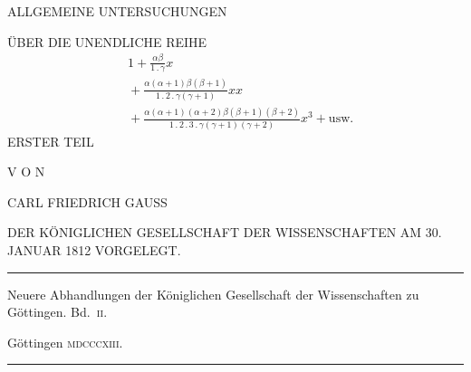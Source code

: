 \clearpage{}\thispagestyle{empty}
\begin{center}
ALLGEMEINE UNTERSUCHUNGEN

\medskip
ÜBER DIE UNENDLICHE REIHE
\[
\begin{aligned}&1+\frac{\alpha\beta}{1\mathbin{.}\gamma}x\\
&{}+\frac{\alpha(\alpha+1)\beta(\beta+1)}{1\mathbin{.}2\mathbin{.}\gamma(\gamma+1)}xx\\
&{}+\frac{\alpha(\alpha+1)(\alpha+2)\beta(\beta+1)(\beta+2)}{1\mathbin{.}2\mathbin{.}3\mathbin{.}\gamma(\gamma+1)(\gamma+2)}x^3+\mathrm{usw.}
\end{aligned}
\]
\bigskip
ERSTER TEIL

\bigskip
V O N

\bigskip
CARL FRIEDRICH GAUSS

\bigskip
DER KÖNIGLICHEN GESELLSCHAFT DER WISSENSCHAFTEN AM 30. JANUAR 1812 VORGELEGT.

\bigskip
\rule{0.7\linewidth}{0.4pt}

Neuere Abhandlungen der Königlichen Gesellschaft der Wissenschaften zu Göttingen. Bd.~\textsc{ii}.

Göttingen \textsc{mdcccxiii}.

\rule{0.7\linewidth}{0.4pt}
\end{center}
